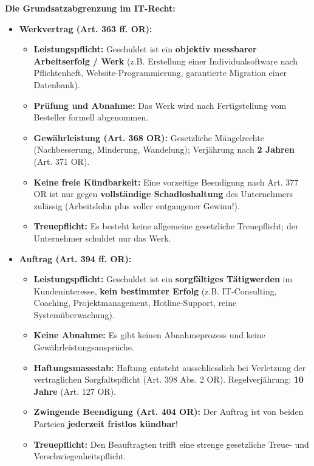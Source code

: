\begin{theorem}
    \textbf{Die Grundsatzabgrenzung im IT-Recht:}
    \begin{itemize}
        \item \textbf{Werkvertrag (Art. 363 ff. OR):}
        \begin{itemize}
            \item \textbf{Leistungspflicht:} Geschuldet ist ein \textbf{objektiv messbarer Arbeitserfolg / Werk} (z.B. Erstellung einer Individualsoftware nach Pflichtenheft, Website-Programmierung, garantierte Migration einer Datenbank).
            \item \textbf{Prüfung und Abnahme:} Das Werk wird nach Fertigstellung vom Besteller formell abgenommen.
            \item \textbf{Gewährleistung (Art. 368 OR):} Gesetzliche Mängelrechte (Nachbesserung, Minderung, Wandelung); Verjährung nach \textbf{2 Jahren} (Art. 371 OR).
            \item \textbf{Keine freie Kündbarkeit:} Eine vorzeitige Beendigung nach Art. 377 OR ist nur gegen \textbf{vollständige Schadloshaltung} des Unternehmers zulässig (Arbeitslohn plus voller entgangener Gewinn!).
            \item \textbf{Treuepflicht:} Es besteht keine allgemeine gesetzliche Treuepflicht; der Unternehmer schuldet nur das Werk.
        \end{itemize}
        \item \textbf{Auftrag (Art. 394 ff. OR):}
        \begin{itemize}
            \item \textbf{Leistungspflicht:} Geschuldet ist ein \textbf{sorgfältiges Tätigwerden} im Kundeninteresse, \textbf{kein bestimmter Erfolg} (z.B. IT-Consulting, Coaching, Projektmanagement, Hotline-Support, reine Systemüberwachung).
            \item \textbf{Keine Abnahme:} Es gibt keinen Abnahmeprozess und keine Gewährleistungsansprüche.
            \item \textbf{Haftungsmassstab:} Haftung entsteht ausschliesslich bei Verletzung der vertraglichen Sorgfaltspflicht (Art. 398 Abs. 2 OR). Regelverjährung: \textbf{10 Jahre} (Art. 127 OR).
            \item \textbf{Zwingende Beendigung (Art. 404 OR):} Der Auftrag ist von beiden Parteien \textbf{jederzeit fristlos kündbar}!
            \item \textbf{Treuepflicht:} Den Beauftragten trifft eine strenge gesetzliche Treue- und Verschwiegenheitspflicht.
        \end{itemize}
    \end{itemize}
\end{theorem}

